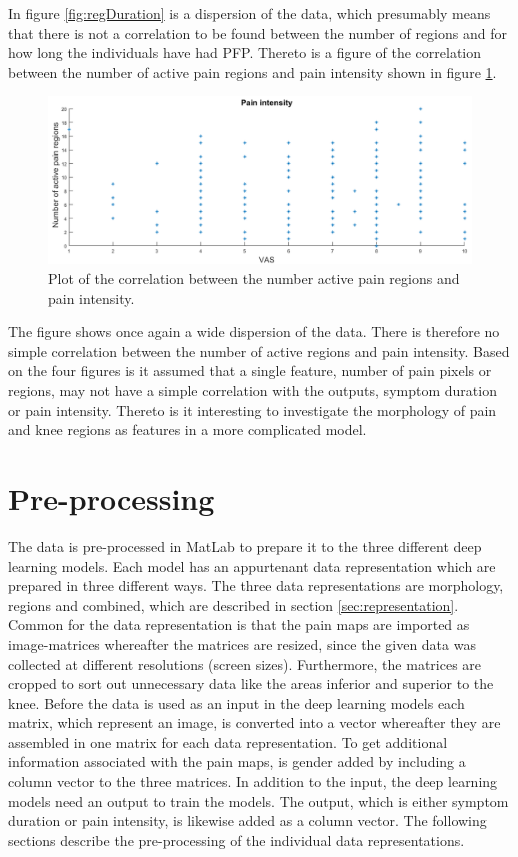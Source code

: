 \newpage
\noindent
In figure \ref{fig:regDuration} is a dispersion of the data, which presumably means that there is not a correlation to be found between the number of regions and for how long the individuals have had PFP. 
Thereto is a figure of the correlation between the number of active pain regions and pain intensity shown in figure \ref{fig:regPain}.

\begin{figure} [H]
\centering
\includegraphics[width=1\textwidth]{figures/regionRegressionPain}
\caption{Plot of the correlation between the number active pain regions and pain intensity.}
\label{fig:regPain}
\end{figure}

\noindent
The figure shows once again a wide dispersion of the data. There is therefore no simple correlation between the number of active regions and pain intensity. 
\noindent
Based on the four figures is it assumed that a single feature, number of pain pixels or regions, may not have a simple correlation with the outputs, symptom duration or pain intensity. Thereto is it interesting to investigate the morphology of pain and knee regions as features in a more complicated model. 


\section{Pre-processing} \label{sec:prepros}
The data is pre-processed in MatLab to prepare it to the three different deep learning models. Each model has an appurtenant data representation which are prepared in three different ways. The three data representations are morphology, regions and combined, which are described in section \ref{sec:representation}. Common for the data representation is that the pain maps are imported as image-matrices whereafter the matrices are resized, since the given data was collected at different resolutions (screen sizes). Furthermore, the matrices are cropped to sort out unnecessary data like the areas inferior and superior to the knee.
Before the data is used as an input in the deep learning models each matrix, which represent an image, is converted into a vector whereafter they are assembled in one matrix for each data representation. To get additional information associated with the pain maps, is gender added by including a column vector to the three matrices.
In addition to the input, the deep learning models need an output to train the models. The output, which is either symptom duration or pain intensity, is likewise added as a column vector.
The following sections describe the pre-processing of the individual data representations.

